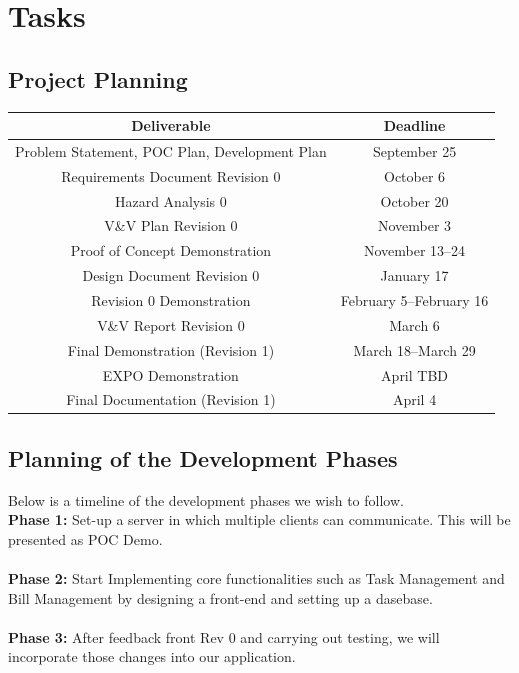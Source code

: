 \documentclass[12pt]{article}
\begin{document}
\section{Tasks}
\subsection{Project Planning}

\begin{center}
\begin{tabular}{ |c|c| } 
\hline
\textbf{Deliverable} & \textbf{Deadline} \\ 
 \hline
 Problem Statement, POC Plan, Development Plan & September 25 \\ 
 Requirements Document Revision 0  & October 6 \\
Hazard Analysis 0 & October 20  \\ 
 V\&V Plan Revision 0 & November 3 \\ 
Proof of Concept Demonstration & November 13--24 \\
Design Document Revision 0 & January 17 \\
Revision 0 Demonstration & February 5--February 16\\
V\&V Report Revision 0 & March 6 \\
Final Demonstration (Revision 1) & March 18--March 29 \\
EXPO Demonstration & April TBD \\
Final Documentation (Revision 1) & April 4 \\
 \hline
\end{tabular}
\end{center}

\subsection{Planning of the Development Phases}

Below is a timeline of the development phases we wish to follow. \\
\textbf{Phase 1: } Set-up a server in which multiple clients can communicate. This will be presented as POC Demo. \\
\\
\textbf{Phase 2: } Start Implementing core functionalities such as Task Management and Bill Management by designing a front-end and setting up a dasebase. \\
\\
\textbf{Phase 3:} After feedback front Rev 0 and carrying out testing, we will incorporate those changes into our application. \\
\end{document}
